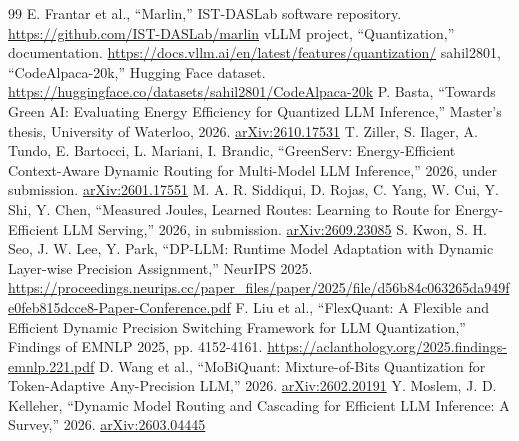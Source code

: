 \begin{thebibliography}{99}
 E. Frantar et al., ``Marlin,'' IST-DASLab software repository. \url{https://github.com/IST-DASLab/marlin}
 vLLM project, ``Quantization,'' documentation. \url{https://docs.vllm.ai/en/latest/features/quantization/}
 sahil2801, ``CodeAlpaca-20k,'' Hugging Face dataset. \url{https://huggingface.co/datasets/sahil2801/CodeAlpaca-20k}
 P. Basta, ``Towards Green AI: Evaluating Energy Efficiency for Quantized LLM Inference,'' Master's thesis, University of Waterloo, 2026. \href{https://arxiv.org/abs/2610.17531}{arXiv:2610.17531}
 T. Ziller, S. Ilager, A. Tundo, E. Bartocci, L. Mariani, I. Brandic, ``GreenServ: Energy-Efficient Context-Aware Dynamic Routing for Multi-Model LLM Inference,'' 2026, under submission. \href{https://arxiv.org/abs/2601.17551}{arXiv:2601.17551}
 M. A. R. Siddiqui, D. Rojas, C. Yang, W. Cui, Y. Shi, Y. Chen, ``Measured Joules, Learned Routes: Learning to Route for Energy-Efficient LLM Serving,'' 2026, in submission. \href{https://arxiv.org/abs/2609.23085}{arXiv:2609.23085}
 S. Kwon, S. H. Seo, J. W. Lee, Y. Park, ``DP-LLM: Runtime Model Adaptation with Dynamic Layer-wise Precision Assignment,'' NeurIPS 2025. \url{https://proceedings.neurips.cc/paper_files/paper/2025/file/d56b84c063265da949fe0feb815dcce8-Paper-Conference.pdf}
 F. Liu et al., ``FlexQuant: A Flexible and Efficient Dynamic Precision Switching Framework for LLM Quantization,'' Findings of EMNLP 2025, pp. 4152-4161. \url{https://aclanthology.org/2025.findings-emnlp.221.pdf}
 D. Wang et al., ``MoBiQuant: Mixture-of-Bits Quantization for Token-Adaptive Any-Precision LLM,'' 2026. \href{https://arxiv.org/abs/2602.20191}{arXiv:2602.20191}
 Y. Moslem, J. D. Kelleher, ``Dynamic Model Routing and Cascading for Efficient LLM Inference: A Survey,'' 2026. \href{https://arxiv.org/abs/2603.04445}{arXiv:2603.04445}
\end{thebibliography}

